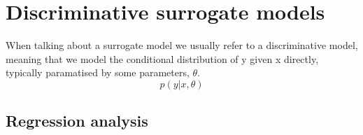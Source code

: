 \chapter{Discriminative surrogate models}
When talking about a surrogate model we usually refer to a discriminative model, meaning
that we model the conditional distribution of y given x directly, typically paramatised by some parameters, $\theta$. 
$$p(y|x, \theta)$$




\section{Regression analysis}

